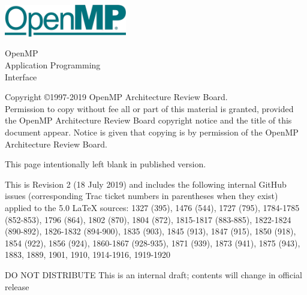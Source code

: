 
  \begin{titlepage}
    \begin{flushleft}
     \hspace{-6em} \includegraphics[width=0.4\textwidth]{openmp-logo.png}
    \end{flushleft}

    \begin{adjustwidth}{-0.75in}{0in}
    \begin{center}
      \Huge
      \textsf{OpenMP\\Application Programming\\Interface}

      \vspace{0.5in}\textsf{    }\vspace{-0.7in}
      \normalsize

      \vspace{1.0in}

      \textbf{\ompversion{}}
    \end{center}
    \end{adjustwidth}

    \vspace{3.0in}

\begin{adjustwidth}{0pt}{1em}\setlength{\parskip}{0.25\baselineskip}%
Copyright \copyright 1997-2019 OpenMP Architecture Review Board.\\
Permission to copy without fee all or part of this material is granted,
provided the OpenMP Architecture Review Board copyright notice and
the title of this document appear. Notice is given that copying is by
permission of the OpenMP Architecture Review Board.\end{adjustwidth}

  \end{titlepage}


\clearpage
\thispagestyle{empty}
\phantom{a}
This page intentionally left blank in published version.

This is Revision 2 (18 July 2019) and includes the following internal 
GitHub issues (corresponding Trac ticket numbers in parentheses when
they exist) applied to the 5.0 LaTeX sources: 1327 (395), 1476 (544), 
1727 (795), 1784-1785 (852-853), 1796 (864), 1802 (870), 1804 (872), 
1815-1817 (883-885), 1822-1824 (890-892), 1826-1832 (894-900), 
1835 (903), 1845 (913), 1847 (915), 1850 (918), 1854 (922), 1856 (924), 
1860-1867 (928-935), 1871 (939), 1873 (941), 1875 (943), 1883, 1889,
1901, 1910, 1914-1916, 1919-1920

DO NOT DISTRIBUTE
This is an internal draft; contents will change in official release

\vfill

